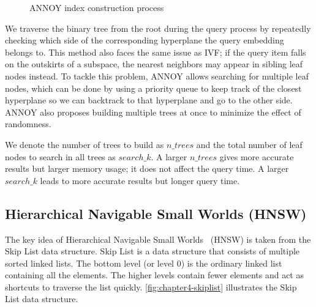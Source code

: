 \begin{figure}[thb!]
    \centering
    \hspace{0.1mm}
    \caption{ANNOY index construction process}
    \label{fig:chapter4-annoy}
\end{figure}

We traverse the binary tree from the root during the query process by repeatedly checking which side of the corresponding hyperplane the query embedding belongs to.
This method also faces the same issue as IVF; if the query item falls on the outskirts of a subspace, the nearest neighbors may appear in sibling leaf nodes instead. To tackle this problem, ANNOY allows searching for multiple leaf nodes, which can be done by using a priority queue to keep track of the closest hyperplane so we can backtrack to that hyperplane and go to the other side. ANNOY also proposes building multiple trees at once to minimize the effect of randomness. 

We denote the number of trees to build as $n\_{trees}$ and the total number of leaf nodes to search in all trees as $search\_k$. A larger $n\_{trees}$ gives more accurate results but larger memory usage; it does not affect the query time. A larger $search\_k$ leads to more accurate results but longer query time.

\subsection{Hierarchical Navigable Small Worlds (HNSW)}
The key idea of Hierarchical Navigable Small Worlds~\cite{Malkov-TPAMI2018-Efficient} (HNSW) is taken from the Skip List data structure. Skip List is a data structure that consists of multiple sorted linked lists. The bottom level (or level 0) is the ordinary linked list containing all the elements. The higher levels contain fewer elements and act as shortcuts to traverse the list quickly. \autoref{fig:chapter4-skiplist} illustrates the Skip List data structure.

